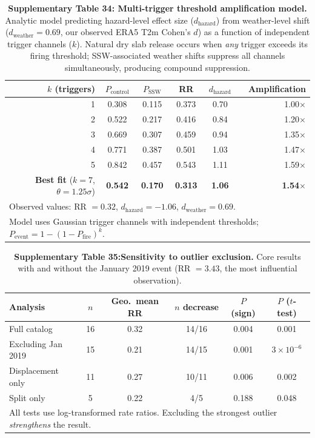 \begin{table}[h!]
\centering
\caption{\textbf{Supplementary Table 34: Multi-trigger threshold amplification model.} Analytic model predicting hazard-level effect size ($d_{\mathrm{hazard}}$) from weather-level shift ($d_{\mathrm{weather}} = 0.69$, our observed ERA5 T2m Cohen's $d$) as a function of independent trigger channels ($k$). Natural dry slab release occurs when \emph{any} trigger exceeds its firing threshold; SSW-associated weather shifts suppress all channels simultaneously, producing compound suppression.}
\label{tab:threshold_amp}
\begin{tabular}{rccccr}
\toprule
$k$ (triggers) & $P_{\mathrm{control}}$ & $P_{\mathrm{SSW}}$ & RR & $d_{\mathrm{hazard}}$ & Amplification \\
\midrule
1 & 0.308 & 0.115 & 0.373 & 0.70 & 1.00$\times$ \\
2 & 0.522 & 0.217 & 0.416 & 0.84 & 1.20$\times$ \\
3 & 0.669 & 0.307 & 0.459 & 0.94 & 1.35$\times$ \\
4 & 0.771 & 0.387 & 0.501 & 1.03 & 1.47$\times$ \\
5 & 0.842 & 0.457 & 0.543 & 1.11 & 1.59$\times$ \\
\midrule
\textbf{Best fit} ($k = 7$, $\theta = 1.25\sigma$) & \textbf{0.542} & \textbf{0.170} & \textbf{0.313} & \textbf{1.06} & \textbf{1.54$\times$} \\
\bottomrule
\multicolumn{6}{l}{\footnotesize Observed values: RR $= 0.32$, $d_{\mathrm{hazard}} = -1.06$, $d_{\mathrm{weather}} = 0.69$.} \\
\multicolumn{6}{l}{\footnotesize Model uses Gaussian trigger channels with independent thresholds; $P_{\mathrm{event}} = 1 - (1 - P_{\mathrm{fire}})^k$.} \\
\end{tabular}
\end{table}

\begin{table}[h!]
\centering
\caption{\textbf{Supplementary Table 35:Sensitivity to outlier exclusion.} Core results with and without the January 2019 event (RR $= 3.43$, the most influential observation).}
\label{tab:outlier_sens}
\begin{tabular}{lccccc}
\toprule
Analysis & $n$ & Geo.\ mean RR & $n$ decrease & $P$ (sign) & $P$ ($t$-test) \\
\midrule
Full catalog & 16 & 0.32 & 14/16 & 0.004 & 0.001 \\
Excluding Jan 2019 & 15 & 0.21 & 14/15 & 0.001 & $3 \times 10^{-6}$ \\
Displacement only & 11 & 0.27 & 10/11 & 0.006 & 0.002 \\
Split only & 5 & 0.22 & 4/5 & 0.188 & 0.048 \\
\bottomrule
\multicolumn{6}{l}{\footnotesize All tests use log-transformed rate ratios. Excluding the strongest outlier \emph{strengthens} the result.} \\
\end{tabular}
\end{table}

